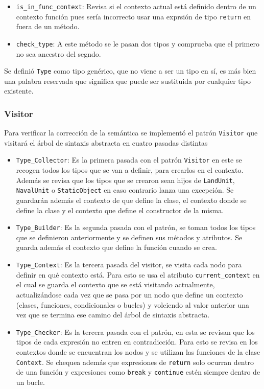 \begin{itemize}
\begin{itemize}
	\item \verb|is_in_func_context|: Revisa si el contexto actual está definido dentro de un contexto función pues sería incorrecto usar una exprsión de tipo \verb|return| en fuera de un método. 
	
	\item \verb|check_type|: A este método se le pasan dos tipos y comprueba que el primero no sea ancestro del segndo.

	
\end{itemize}

\end{itemize}

Se definió \verb|Type| como tipo genérico, que no viene a ser un tipo en sí, es más bien una palabra reservada que significa que puede ser sustituida por cualquier tipo existente.

\subsubsection{Visitor}
Para verificar la correcci\'on de la sem\'antica se implement\'o el patr\'on \verb|Visitor| que visitar\'a el \'arbol de sintaxis abstracta en cuatro pasadas distintas
\begin{itemize}
\item \verb|Type_Collector|: Es la primera pasada con el patr\'on \verb|Visitor| en este se recogen todos los tipos que se van a definir, para crearlos en el contexto. Además se revisa que los tipos que se crearon sean hijos de  \verb|LandUnit|, \verb|NavalUnit| o \verb|StaticObject| en caso contrario lanza una excepción. Se guardarán además el contexto de que define la clase, el contexto donde se define la clase y el contexto que define el constructor de la misma.

\item \verb|Type_Builder|: Es la segunda pasada con el patr\'on, se toman todos los tipos que se definieron anteriormente y se definen sus m\'etodos y atributos. Se guarda además el contexto que define la función cuando se crea.

\item \verb|Type_Context|: Es la tercera pasada del visitor, se visita cada nodo para definir en qu\'e contexto est\'a. Para esto se usa el atributo \verb|current_context| en el cual se guarda el contexto que se está visitando actualmente, actualizándose cada vez que se pasa por un nodo que define un contexto (clases, funciones, condicionales o bucles) y volciendo al valor anterior una vez que se termina ese camino del \'arbol de sintaxis abstracta. 

\item \verb|Type_Checker|: Es la tercera pasada con el patr\'on, en esta se revisan que los tipos de cada expresi\'on no entren en contradicci\'on. Para esto se revisa en los contextos donde se encuentran los nodos y se utilizan las funciones de la clase \verb|Context|. Se chequea adem\'as que expresiones de \verb|return| solo ocurran dentro de una función y expresiones como \verb|break| y \verb|continue| estén siempre dentro de un bucle.


\end{itemize}


